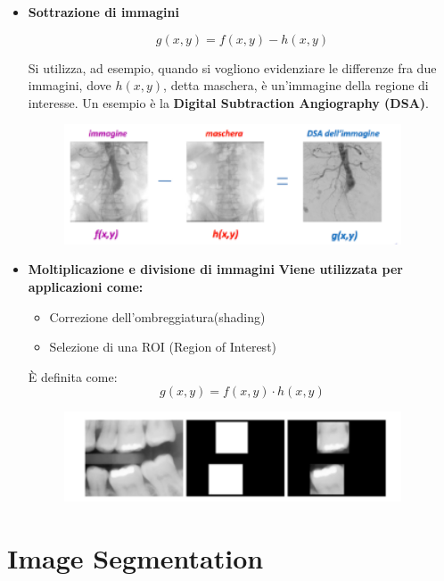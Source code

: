 \begin{itemize}
    \item \textbf{Sottrazione di immagini}

          $$
              g(x,y) = f(x,y)-h(x,y)
          $$

          Si utilizza, ad esempio, quando si vogliono evidenziare le differenze
          fra due immagini, dove $h(x,y)$, detta maschera, è un'immagine della
          regione di interesse. Un esempio è la \textbf{Digital Subtraction
              Angiography (DSA)}.
          \begin{figure}[H]
              \centering
              \includegraphics[width=10cm, keepaspectratio]{capitoli/immagini/imgs/sottrazione.png}
          \end{figure}

    \item \textbf{Moltiplicazione e divisione di immagini}
          \textbf{Viene utilizzata per applicazioni come:}
          \begin{itemize}
              \item Correzione dell'ombreggiatura(shading)
              \item Selezione di una ROI (Region of Interest)
          \end{itemize}
          È definita come:
          $$
              g(x,y) = f(x,y) \cdot h(x,y)
          $$


          \begin{figure}[H]
              \centering
              \includegraphics[width=10cm, keepaspectratio]{capitoli/immagini/imgs/moltiplicazione.png}
          \end{figure}
\end{itemize}


\chapter{Image Segmentation}

